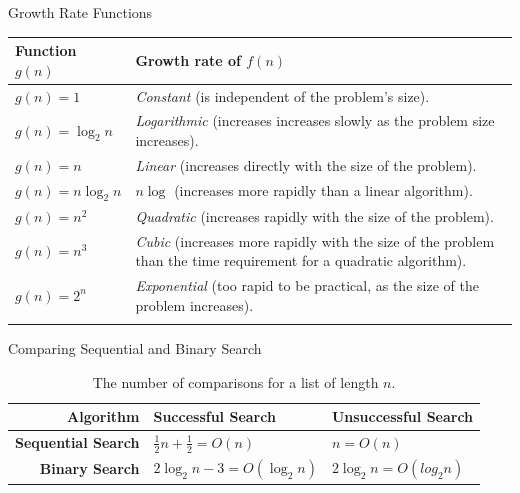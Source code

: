 \documentclass[14pt,aspectratio=1610]{beamer}
\begin{document}
\begin{frame}{Growth Rate Functions}
\small
\begin{tabularx}{1\textwidth}{l X}
  \toprule{}
  \textbf{Function $g(n)$} & \textbf{Growth rate of $f(n)$}\\
  \midrule%
  $g(n) = 1$        & \emph{Constant} (is independent of the problem's size).\\
  $g(n) = \log_2n$  & \emph{Logarithmic} (increases increases slowly
                  as the problem size increases).\\
  $g(n) = n$        & \emph{Linear} (increases directly with the size
                  of the problem).\\
  $g(n) = n \log_2n$ & $n\log$ (increases more rapidly than a linear algorithm).\\
  $g(n) = n^2$      & \emph{Quadratic} (increases rapidly with the
                  size of the problem).\\
  $g(n) = n^3$      & \emph{Cubic} (increases more rapidly with the
                  size of the problem than the time requirement for a quadratic algorithm).\\
  $g(n) = 2^n$     & \emph{Exponential} (too rapid to be practical, as the size of the problem increases).\\
  \bottomrule{}
\end{tabularx}
\end{frame}

\begin{frame}{Comparing Sequential and Binary Search}

\begin{table}[]
\small
\begin{tabular}{r l l}
\toprule%
\textbf{Algorithm} & \textbf{Successful Search} & \textbf{Unsuccessful Search}\\%
\midrule
\textbf{Sequential Search} & $\frac{1}{2}n + \frac{1}{2} = O(n)$ & $n = O(n)$\\[1.5ex]
\textbf{Binary Search} & $2\log_2n - 3 = O(\log_2n)$ & $2\log_2n = O(log_2{n})$\\%
\bottomrule
\end{tabular}
\caption{The number of comparisons for a list of length $n$.}
\end{table}
\end{frame}
\end{document}
